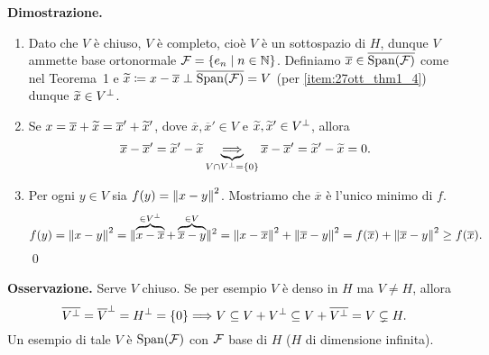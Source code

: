 
\textbf{Dimostrazione.}
\begin{enumerate}

\item Dato che $V$ è chiuso, $V$ è completo, cioè $V$ è un sottospazio di $H$, dunque $V$ ammette base ortonormale $\mathcal{F} = \left\{ e_n \;\middle|\; n \in \mathbb N \right\}$.
Definiamo $\overline{x} \in \overline{\operatorname{Span}(\mathcal{F})}$ come nel Teorema~1 e $\widetilde{x} \coloneqq x - \overline{x} \perp \overline{\operatorname{Span}(\mathcal{F})} = V$ (per \ref{item:27ott_thm1_4}) dunque $\widetilde{x} \in V^\perp$.

\item Se $x = \overline{x} + \widetilde{x} = \overline{x}' + \widetilde{x}'$, dove $\overline{x}, \overline{x}' \in V$ e $\widetilde{x}, \widetilde{x}' \in V^\perp$, allora
%
$$
	\overline{x} - \overline{x}' = \widetilde{x}' - \widetilde{x} \underbrace{\Longrightarrow}_{V \cap V^\perp = \{0 \} }
	\overline{x} - \overline{x}' = \widetilde{x}' - \widetilde{x} = 0.
$$
%

\item Per ogni $y \in V$ sia $f(y) = \left\lVert x - y \right\rVert^2$. Mostriamo che $\overline{x}$ è l'unico minimo di $f$.
%
$$
f(y) = \left\lVert x - y \right\rVert^2 = \lVert{\overbrace{x - \overline{x}}^{\in V^\perp} + \overbrace{\overline{x} - y}^{\in V}}\rVert^2 = \left\lVert x - \overline{x} \right\rVert^2 + \left\lVert \overline{x} - y \right\rVert^2
= f(\overline{x}) + \left\lVert \overline{x} - y \right\rVert^2 \geq f(\overline{x}).
$$
%
\qed
\end{enumerate}

\vs

\textbf{Osservazione.}
Serve $V$ chiuso. Se per esempio $V$ è denso in $H$ ma $V \neq H$, allora
%
$$
\overline{V^\perp} = \overline{V}^\perp = H^\perp = \{0\} \Longrightarrow V \subseteq V + V^\perp \subseteq V + \overline{V^\perp} = V \subsetneq H.
$$
%
Un esempio di tale $V$ è $\operatorname{Span}(\mathcal{F})$ con $\mathcal{F}$ base di $H$ ($H$ di dimensione infinita).

